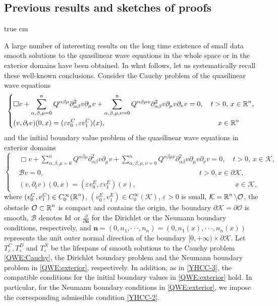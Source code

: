 \documentclass[11pt,twoside]{article}
\def\cB{\mathcal B}
\def\cK{\mathcal K}
\def\cO{\mathcal O}
\def\R{\mathop{\mathbb R\kern 0pt}\nolimits}
\def\al{\alpha}
\def\p{\partial}
\def\ve{\varepsilon}
\def\bn{\mathbf{n}}
\theoremstyle{plain}
\theoremstyle{definition}
\numberwithin{equation}{section}
\begin{document}
\subsection{Previous results and sketches of proofs}\label{YinA-5}

 true cm

A large number of  interesting results on the long time existence of small data smooth solutions to
the quasilinear wave equations in the whole space or in the exterior domains have been obtained.
In what follows, let us systematically recall these well-known conclusions.
Consider the Cauchy problem of the quasilinear wave equations
\begin{equation}\label{QWE:Cauchy}
\left\{
\begin{aligned}
&\Box v+\sum_{\alpha,\beta,\mu=0}^nQ^{\alpha\beta\mu}\p^2_{\alpha\beta}v\p_{\mu}v
+\sum_{\al,\beta,\mu,\nu=0}^nQ^{\alpha\beta\mu\nu}\p^2_{\alpha\beta}v\p_{\mu}v\p_{\nu}v=0 ,\quad t>0,\, x\in\R^n,\\
&(v,\p_tv)(0,x)=(\ve v^C_0,\ve v^C_1)(x),\qquad \qquad \qquad \qquad \qquad \qquad \qquad \qquad x\in\R^n
\end{aligned}
\right.
\end{equation}
and the initial boundary value problem of the quasilinear wave equations in exterior domains
\begin{equation}\label{QWE:exterior}
\left\{
\begin{aligned}
&\Box v+\sum_{\alpha,\beta,\mu=0}^nQ^{\alpha\beta\mu}\p^2_{\al\beta}v\p_{\mu}v
+\sum_{\alpha,\beta,\mu,\nu=0}^nQ^{\alpha\beta\mu\nu}\p^2_{\alpha\beta}v\p_{\mu}v\p_{\nu}v=0 ,\quad t>0,\, x\in\cK,\\
&\cB v=0,\qquad \qquad \qquad \qquad \qquad \qquad \qquad \qquad \qquad \qquad \qquad t>0, x\in\p\cK,\\
&(v,\p_tv)(0,x)=(\ve v^E_0,\ve v^E_1)(x),\qquad \qquad \qquad \qquad \qquad \qquad \qquad x\in\cK,
\end{aligned}
\right.
\end{equation}
where $(v^C_0,v^C_1)\in C_0^{\infty}(\R^n)$, $(v^E_0,v^E_1)\in C_0^{\infty}(\cK)$, $\ve>0$ is small,
$\cK=\R^n\setminus\cO$, the obstacle $\cO\subset\R^n$ is compact and contains the origin, the boundary $\p\cK=\p\cO$ is smooth,
$\cB$ denotes ${\rm Id}$ or $\frac{\p}{\p\bn}$ for the Dirichlet or the Neumann boundary conditions, respectively,
and $\bn=(0, n_1,\cdot\cdot\cdot, n_n)=(0, n_1(x),\cdot\cdot\cdot, n_n(x))$ represents the unit outer normal direction of the boundary $[0,+\infty)\times\p\cK$.
Let $T_{\ve}^{C}, T_{\ve}^{D}$ and $T_{\ve}^{N}$ be the lifespans of smooth solutions to the Cauchy problem \eqref{QWE:Cauchy},
the Dirichlet boundary problem and the Neumann boundary problem in \eqref{QWE:exterior}, respectively.
In addition, as in \eqref{YHCC-3}, the compatible conditions for the initial boundary values in \eqref{QWE:exterior}
hold. In particular, for the Neumann boundary conditions in  \eqref{QWE:exterior}, we impose the corresponding admissible condition \eqref{YHCC-2}.
\end{document}
